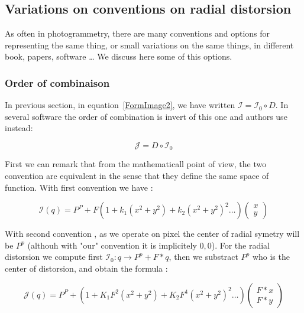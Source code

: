 
\subsection{Variations on  conventions on radial distorsion}

As often in photogrammetry, there are many conventions and options for representing the same thing,
or small variations on the same things, in different book, papers, software \dots
We discuss here some of this options.


\subsubsection{Order of combinaison}

In previous section, in equation~\ref{FormImage2}, we have written  $ \mathcal{I} = \mathcal{I}_0  \circ D \label{FormImage2}$.
In several software the order of combination is invert of this one and authors use instead:

\begin{equation}
	\mathcal{J} = D \circ  \mathcal{I}_0  
\end{equation}

First we can remark that from the mathematicall point of view, the two convention are equivalent in the sense
that they define the same space of function.  With first convention we have :

\begin{equation}
	\mathcal{I}(q) = P^P + F (1 + k_1 (x^2+y^2) +  k_2 (x^2+y^2) ^2 \dots)  \begin{pmatrix} x \\ y \end{pmatrix}
\end{equation}

With second convention , as we operate on pixel the center of radial symetry will  be $P^p$ 
(althouh with "our" convention it is implicitely $0,0$). For the radial distorsion 
we compute first  $  \mathcal{I}_0 : q \rightarrow  P^p + F*q$, then we substract 
$P^p$  who is the center of distorsion, and obtain the formula :

\begin{equation}
	\mathcal{J}(q) = P^P + (1 + K_1 F^2 (x^2+y^2) +  K_2  F^4 (x^2+y^2) ^2 \dots)  \begin{pmatrix} F*x \\ F*y \end{pmatrix}
\end{equation}

